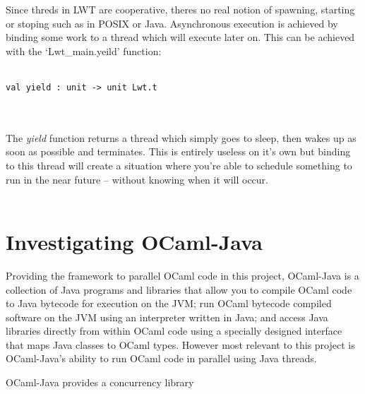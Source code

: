\documentclass[12pt,twoside,notitlepage]{report}
\begin{document}
Since threds in LWT are cooperative, theres no real notion of spawning, starting or stoping such as in POSIX or Java. Asynchronous execution is achieved by binding some work to a thread which will execute later on. This can be
achieved with the `Lwt\_main.yeild' function:
\\
\\
\begin{lstlisting}[frame=single]
val yield : unit -> unit Lwt.t
\end{lstlisting}
\\
\\
The {\em yield} function returns a thread which simply goes to sleep, then wakes up as soon as possible and terminates. This is entirely useless on it's own but binding to this thread will create a situation where you're able to
schedule something to run in the near future -- without knowing when it will occur.
\\
\\
\section{Investigating OCaml-Java}
\label{sec:investigating_ocaml-java}
%
%
Providing the framework to parallel OCaml code in this project, OCaml-Java is a collection of Java programs and libraries that allow you to compile OCaml code to Java bytecode for execution on the JVM; run OCaml bytecode compiled
software on the JVM using an interpreter written in Java; and access Java libraries directly from within OCaml code using a specially designed interface that maps Java classes to OCaml types. However most relevant to this project is
OCaml-Java's ability to run OCaml code in parallel using Java threads.

%
%
OCaml-Java provides a concurrency library 
%
%




%
%

%
%
\end{document}

